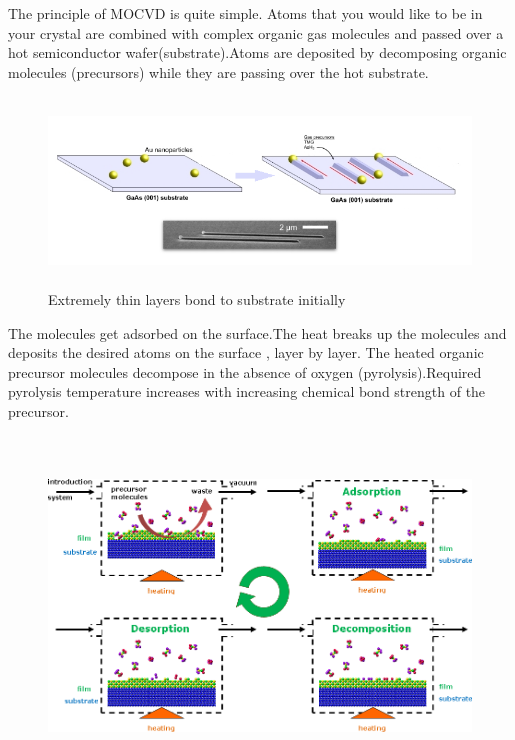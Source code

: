 \begin{flushleft}
\newline
The principle of MOCVD is quite simple.\vspace{3mm}\newline 
Atoms that you would like to be in your crystal are combined with complex organic gas molecules and passed over a hot semiconductor wafer(substrate).Atoms are deposited by decomposing organic molecules (precursors) while they are passing over the hot substrate.  
\begin{figure}[h!] 
	\centering
	\includegraphics[width=14cm, height=5cm]{images/deposition.png} 
	\caption{Extremely thin layers bond to substrate initially}
	\label{fig:img3}  
\end{figure}
\vspace{3mm}
\newline
The molecules get adsorbed on the surface.The heat breaks up the molecules and deposits the desired atoms on the surface , layer by layer.
\vspace{3mm}
\newline
The heated organic precursor molecules decompose in the absence of oxygen (pyrolysis).Required pyrolysis temperature increases with increasing chemical bond strength of the precursor. 
\vspace{4mm}
\newline 
\begin{figure}[h!] 
	\centering
	\includegraphics[width=12cm, height=9cm]{images/principles.png} 

\end{figure}
\end{flushleft}
